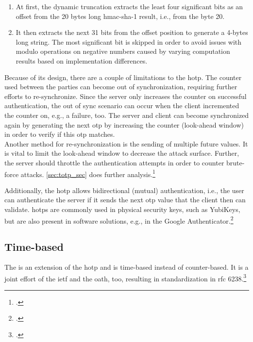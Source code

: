 \begin{enumerate}
	\item At first, the dynamic truncation extracts the least four significant bits as an offset from the 20 bytes long \gls{hmac}-\gls{sha}-1 result, i.e., from the byte 20.
	\item It then extracts the next 31 bits from the offset position to generate a 4-bytes long string. The most significant bit is skipped in order to avoid issues with modulo operations on negative numbers caused by varying computation results based on implementation differences.
\end{enumerate}

Because of its design, there are a couple of limitations to the \gls{hotp}. The counter used between the parties can become out of synchronization, requiring further efforts to re-synchronize. Since the server only increases the counter on successful authentication, the out of sync scenario can occur when the client incremented the counter on, e.g., a failure, too. The server and client can become synchronized again by generating the next \gls{otp} by increasing the counter (look-ahead window) in order to verify if this \gls{otp} matches.\\
Another method for re-synchronization is the sending of multiple future values. It is vital to limit the look-ahead window to decrease the attack surface. Further, the server should throttle the authentication attempts in order to counter brute-force attacks. \autoref{sec:totp_sec} does further analysis.\footcites[See][236]{Schwartz2018}[See][Chapter 13.5.1]{2308830}

Additionally, the \gls{hotp} allows bidirectional (mutual) authentication, i.e., the user can authenticate the server if it sends the next \gls{otp} value that the client then can validate. \Glspl{hotp} are commonly used in physical security keys, such as YubiKeys, but are also present in software solutions, e.g., in the Google Authenticator.\footcites[See][716]{HUSEYNOV2017715}[See][14]{m2005rfc}

\subsection{Time-based}
\label{subsec:totp}

The  is an extension of the \gls{hotp} and is time-based instead of counter-based. It is a joint effort of the \gls{ietf} and the \gls{oath}, too, resulting in standardization in \gls{rfc} 6238.\footcite[See][]{m2011rfc}

